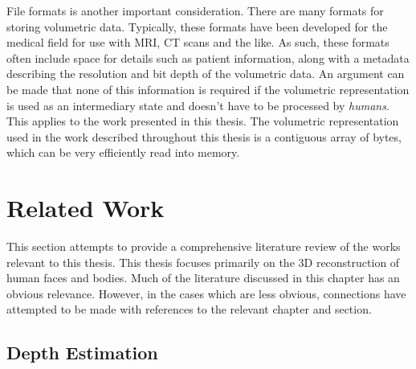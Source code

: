 File formats is another important consideration. There are many
formats for storing volumetric data. Typically, these formats have
been developed for the medical field for use with MRI, CT scans and
the like. As such, these formats often include space for details such
as patient information, along with a metadata describing the
resolution and bit depth of the volumetric data. An argument can be
made that none of this information is required if the volumetric
representation is used as an intermediary state and doesn't have to be
processed by \textit{humans}. This applies to the work presented in
this thesis. The volumetric representation used in the work described
throughout this thesis is a contiguous array of bytes, which can be
very efficiently read into memory.


\section{Related Work}



This section attempts to provide a comprehensive literature review of
the works relevant to this thesis. This thesis focuses primarily on
the 3D reconstruction of human faces and bodies. Much of the
literature discussed in this chapter has an obvious
relevance. However, in the cases which are less obvious, connections
have attempted to be made with references to the relevant chapter and
section.


\subsection{Depth Estimation}


